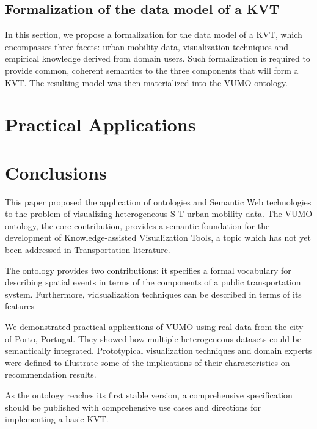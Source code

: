 \subsection{Formalization of the data model of a KVT}

In this section, we propose a formalization for the data model of a KVT, which encompasses three facets: urban mobility data, visualization techniques and empirical knowledge derived from domain users. Such formalization is required to provide common, coherent semantics to the three components that will form a KVT. The resulting model was then materialized into the VUMO ontology.

\section{Practical Applications}
\label{sec:practical}

\section{Conclusions}

This paper proposed the application of ontologies and Semantic Web technologies to the problem of visualizing heterogeneous S-T urban mobility data. The VUMO ontology, the core contribution, provides a semantic foundation for the development of Knowledge-assisted Visualization Tools, a topic which has not yet been addressed in Transportation literature.

The ontology provides two contributions: it specifies a formal vocabulary for describing spatial events in terms of the components of a public transportation system. Furthermore, vidsualization techniques can be described in terms of its features

We demonstrated practical applications of VUMO using real data from the city of Porto, Portugal. They showed how multiple heterogeneous datasets could be semantically integrated. Prototypical visualization techniques and domain experts were defined to illustrate some of the implications of their characteristics on recommendation results.

As the ontology reaches its first stable version, a comprehensive specification should be published with comprehensive use cases and directions for implementing a basic KVT.

\label{sec:conclusions}